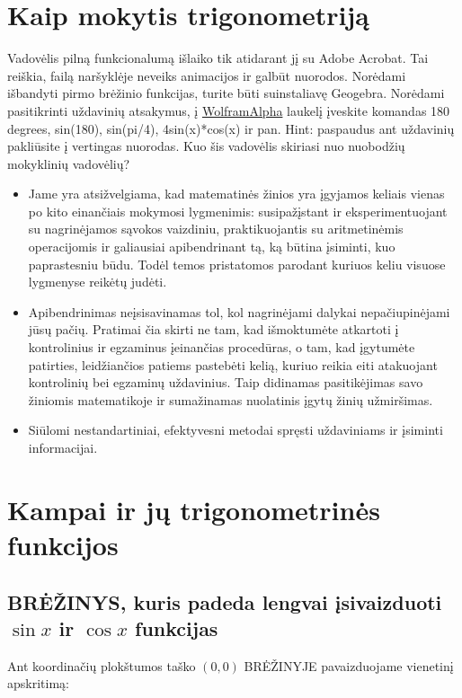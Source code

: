 \documentclass[a4paper]{article}
\begin{document}
\section*{Kaip mokytis trigonometriją}
Vadovėlis pilną funkcionalumą išlaiko tik atidarant jį su Adobe Acrobat. Tai reiškia, failą naršyklėje neveiks animacijos ir galbūt nuorodos. Norėdami išbandyti pirmo brėžinio funkcijas, turite būti suinstaliavę Geogebra. Norėdami pasitikrinti uždavinių atsakymus, į \href{http://wolframalpha.com}{WolframAlpha} laukelį įveskite komandas 180 degrees, sin(180), sin(pi/4), 4sin(x)*cos(x) ir pan. Hint: paspaudus ant uždavinių pakliūsite į vertingas nuorodas.
\newline
\newline
Kuo šis vadovėlis skiriasi nuo nuobodžių mokyklinių vadovėlių? 
\begin{itemize}
\item Jame yra atsižvelgiama, kad matematinės žinios yra įgyjamos keliais vienas po kito einančiais mokymosi lygmenimis: susipažįstant ir eksperimentuojant su nagrinėjamos sąvokos vaizdiniu, praktikuojantis su aritmetinėmis operacijomis ir galiausiai apibendrinant tą, ką būtina įsiminti, kuo paprastesniu būdu. Todėl temos pristatomos parodant kuriuos keliu visuose lygmenyse reikėtų judėti.
\item Apibendrinimas neįsisavinamas tol, kol nagrinėjami dalykai nepačiupinėjami jūsų pačių. Pratimai čia skirti ne tam, kad išmoktumėte atkartoti į kontrolinius ir egzaminus įeinančias procedūras, o tam, kad įgytumėte patirties, leidžiančios patiems pastebėti kelią, kuriuo reikia eiti atakuojant kontrolinių bei egzaminų uždavinius. Taip didinamas pasitikėjimas savo žiniomis matematikoje ir sumažinamas nuolatinis įgytų žinių užmiršimas.
\item Siūlomi nestandartiniai, efektyvesni metodai spręsti uždaviniams ir įsiminti informacijai.
\end{itemize}
\newpage 
\section{Kampai ir jų trigonometrinės funkcijos}

\subsection{BRĖŽINYS, kuris padeda lengvai įsivaizduoti $\sin x$ ir $\cos x$ funkcijas}

Ant koordinačių plokštumos taško $(0, 0)$ BRĖŽINYJE pavaizduojame vienetinį apskritimą:
\end{document}
